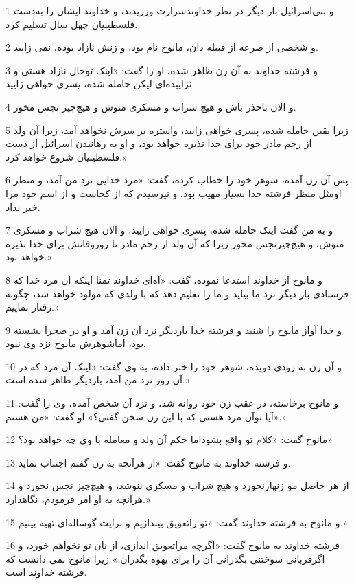 \par 1 و بنی‌اسرائیل بار دیگر در نظر خداوندشرارت ورزیدند، و خداوند ایشان را به‌دست فلسطینیان چهل سال تسلیم کرد.
\par 2 و شخصی از صرعه از قبیله دان، مانوح نام بود، و زنش نازاد بوده، نمی زایید.
\par 3 و فرشته خداوند به آن زن ظاهر شده، او را گفت: «اینک توحال نازاد هستی و نزاییده‌ای لیکن حامله شده، پسری خواهی زایید.
\par 4 و الان باحذر باش و هیچ شراب و مسکری منوش و هیچ‌چیز نجس مخور.
\par 5 زیرا یقین حامله شده، پسری خواهی زایید، واستره بر سرش نخواهد آمد، زیرا آن ولد از رحم مادر خود برای خدا نذیره خواهد بود، و او به رهانیدن اسرائیل از دست فلسطینیان شروع خواهد کرد.»
\par 6 پس آن زن آمده، شوهر خود را خطاب کرده، گفت: «مرد خدایی نزد من آمد، و منظر اومثل منظر فرشته خدا بسیار مهیب بود. و نپرسیدم که از کجاست و از اسم خود مرا خبر نداد.
\par 7 و به من گفت اینک حامله شده، پسری خواهی زایید، و الان هیچ شراب و مسکری منوش، و هیچ‌چیزنجس مخور زیرا که آن ولد از رحم مادر تا روزوفاتش برای خدا نذیره خواهد بود.»
\par 8 و مانوح از خداوند استدعا نموده، گفت: «آه‌ای خداوند تمنا اینکه آن مرد خدا که فرستادی بار دیگر نزد ما بیاید و ما را تعلیم دهد که با ولدی که مولود خواهد شد، چگونه رفتار نماییم.»
\par 9 و خدا آواز مانوح را شنید و فرشته خدا باردیگر نزد آن زن آمد و او در صحرا نشسته بود، اماشوهرش مانوح نزد وی نبود.
\par 10 و آن زن به زودی دویده، شوهر خود را خبر داده، به وی گفت: «اینک آن مرد که در آن روز نزد من آمد، باردیگر ظاهر شده است.»
\par 11 و مانوح برخاسته، در عقب زن خود روانه شد، و نزد آن شخص آمده، وی را گفت: «آیا توآن مرد هستی که با این زن سخن گفتی؟» او گفت: «من هستم.»
\par 12 مانوح گفت: «کلام تو واقع بشوداما حکم آن ولد و معامله با وی چه خواهد بود؟»
\par 13 و فرشته خداوند به مانوح گفت: «از هر‌آنچه به زن گفتم اجتناب نماید.
\par 14 از هر حاصل مو زنهارنخورد و هیچ شراب و مسکری ننوشد، و هیچ‌چیز نجس نخورد و هر‌آنچه به او امر فرمودم، نگاهدارد.»
\par 15 و مانوح به فرشته خداوند گفت: «تو راتعویق بیندازیم و برایت گوساله‌ای تهیه بینیم.» 
\par 16 فرشته خداوند به مانوح گفت: «اگر‌چه مراتعویق اندازی، از نان تو نخواهم خورد، و اگرقربانی سوختنی بگذرانی آن را برای یهوه بگذران.» زیرا مانوح نمی دانست که فرشته خداوند است.

